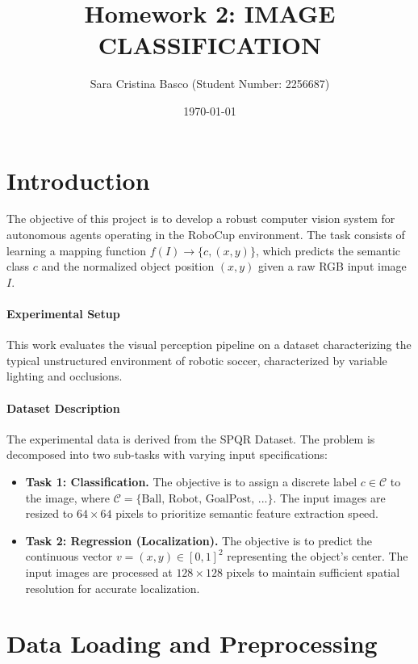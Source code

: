 \documentclass[a4paper,11pt]{article}
\title{\textbf{Homework 2: IMAGE CLASSIFICATION}}
\author{Sara Cristina Basco (Student Number: 2256687)}
\date{\today}
\begin{document}
\maketitle
\section{Introduction}
The objective of this project is to develop a robust computer vision system for autonomous agents operating in the RoboCup environment. The task consists of learning a mapping function $f(I) \rightarrow \{c, (x,y)\}$, which predicts the semantic class $c$ and the normalized object position $(x,y)$ given a raw RGB input image $I$.

\paragraph{Experimental Setup}
This work evaluates the visual perception pipeline on a dataset characterizing the typical unstructured environment of robotic soccer, characterized by variable lighting and occlusions.

\paragraph{Dataset Description}
The experimental data is derived from the SPQR Dataset. The problem is decomposed into two sub-tasks with varying input specifications:

\begin{itemize}
    \item \textbf{Task 1: Classification.} The objective is to assign a discrete label $c \in \mathcal{C}$ to the image, where $\mathcal{C} = \{\text{Ball, Robot, GoalPost, ...}\}$. The input images are resized to $64 \times 64$ pixels to prioritize semantic feature extraction speed.
    
    \item \textbf{Task 2: Regression (Localization).} The objective is to predict the continuous vector $v = (x, y) \in [0, 1]^2$ representing the object's center. The input images are processed at $128 \times 128$ pixels to maintain sufficient spatial resolution for accurate localization.
\end{itemize}

\section{Data Loading and Preprocessing}
\end{document}
